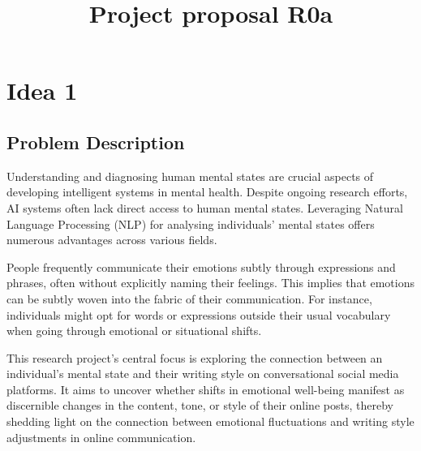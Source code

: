 \documentclass[conference,compsoc]{IEEEtran}
\begin{document}
\title{Project proposal R0a}

\author{
\and
{}
}

\maketitle







\maketitle
\section{Idea 1}
\subsection{Problem Description}
Understanding and diagnosing human mental states are crucial aspects of developing intelligent systems in  mental health. Despite ongoing research efforts, AI systems often lack direct access to human mental states. Leveraging Natural Language Processing (NLP) for analysing individuals' mental states offers numerous advantages across various fields.

People frequently communicate their emotions subtly through expressions and phrases, often without explicitly naming their feelings. This implies that emotions can be subtly woven into the fabric of their communication. For instance, individuals might opt for words or expressions outside their usual vocabulary when going through emotional or situational shifts.

This research project's central focus is exploring the connection between an individual's mental state and their writing style on conversational social media platforms. It aims to uncover whether shifts in emotional well-being manifest as discernible changes in the content, tone, or style of their online posts, thereby shedding light on the connection between emotional fluctuations and writing style adjustments in online communication.
\end{document}
